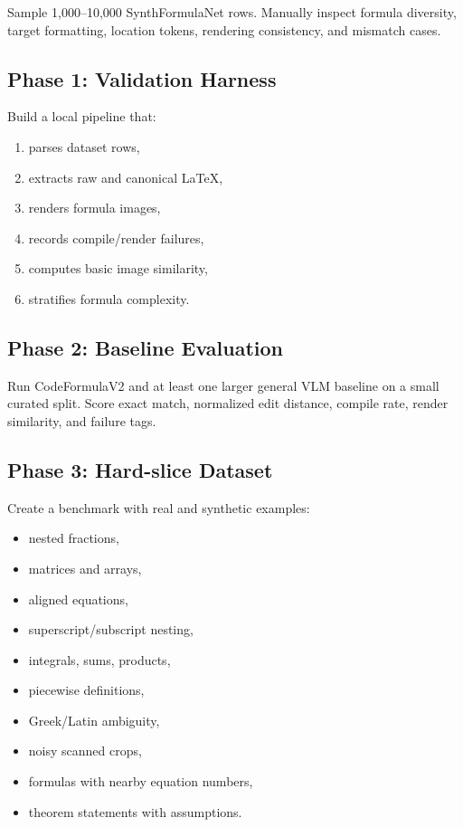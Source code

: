 \documentclass[11pt]{article}
\begin{document}
Sample 1,000--10,000 SynthFormulaNet rows. Manually inspect formula diversity, target formatting, location tokens, rendering consistency, and mismatch cases.

\subsection{Phase 1: Validation Harness}

Build a local pipeline that:

\begin{enumerate}[leftmargin=*]
\item parses dataset rows,
\item extracts raw and canonical \LaTeX,
\item renders formula images,
\item records compile/render failures,
\item computes basic image similarity,
\item stratifies formula complexity.
\end{enumerate}

\subsection{Phase 2: Baseline Evaluation}

Run CodeFormulaV2 and at least one larger general VLM baseline on a small curated split. Score exact match, normalized edit distance, compile rate, render similarity, and failure tags.

\subsection{Phase 3: Hard-slice Dataset}

Create a benchmark with real and synthetic examples:

\begin{itemize}[leftmargin=*]
\item nested fractions,
\item matrices and arrays,
\item aligned equations,
\item superscript/subscript nesting,
\item integrals, sums, products,
\item piecewise definitions,
\item Greek/Latin ambiguity,
\item noisy scanned crops,
\item formulas with nearby equation numbers,
\item theorem statements with assumptions.
\end{itemize}
\end{document}
